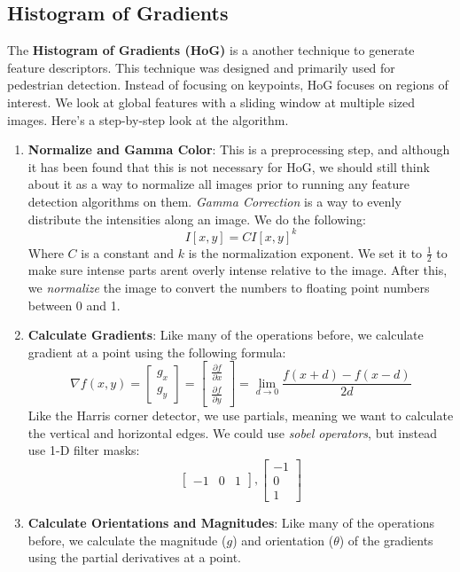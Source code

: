 \documentclass{article}
\begin{document}
\subsection{Histogram of Gradients}
The \textbf{Histogram of Gradients (HoG)} is a another technique to generate feature descriptors. This technique was designed and primarily used for pedestrian detection. Instead of focusing on keypoints, HoG focuses on regions of interest. We look at global features with a sliding window at multiple sized images. Here's a step-by-step look at the algorithm.
\begin{enumerate}
    \item \textbf{Normalize and Gamma Color}: This is a preprocessing step, and although it has been found that this is not necessary for HoG, we should still think about it as a way to normalize all images prior to running any feature detection algorithms on them. \textit{Gamma Correction} is a way to evenly distribute the intensities along an image. We do the following: 
    $$I[x,y] = CI[x,y]^k$$
    Where $C$ is a constant and $k$ is the normalization exponent. We set it to $\frac{1}{2}$ to make sure intense parts arent overly intense relative to the image. After this, we \textit{normalize} the image to convert the numbers to floating point numbers between 0 and 1.  
    \item \textbf{Calculate Gradients}: Like many of the operations before, we calculate gradient at a point using the following formula:
    $$\nabla f(x,y) = \begin{bmatrix}
    g_x\\g_y
    \end{bmatrix} = \begin{bmatrix}
    \frac{\partial f}{\partial x}\\\frac{\partial f}{\partial y}
    \end{bmatrix} = \lim_{d\rightarrow 0}\frac{f(x+d)- f(x-d)}{2d}$$
    Like the Harris corner detector, we use partials, meaning we want to calculate the vertical and horizontal edges. We could use \textit{sobel operators}, but instead use 1-D filter masks: $$\begin{bmatrix}
    -1 & 0 & 1
    \end{bmatrix}, \begin{bmatrix}
    -1 \\ 0 \\ 1
    \end{bmatrix}$$
    \item \textbf{Calculate Orientations and Magnitudes}: Like many of the operations before, we calculate the magnitude ($g$) and orientation ($\theta$) of the gradients using the partial derivatives at a point. 

\end{enumerate}
\end{document}
